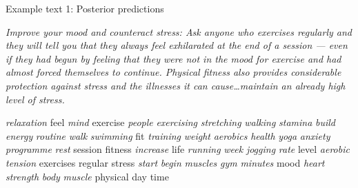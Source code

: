 \begin{frame}{Example text 1: Posterior predictions}

	{\small\textit{
Improve your mood and counteract stress: Ask anyone who exercises regularly and
they will tell you that they always feel exhilarated at the end of a session —
even if they had begun by feeling that they were not in the mood for exercise
and had almost forced themselves to continue. Physical fitness also provides
considerable protection against stress and the illnesses it can cause\ldots maintain an already high level of stress.
    }}
    \begin{center}
{\fontsize{7.29}{30}\selectfont \textit{relaxation}}
{\fontsize{13.42}{30}\selectfont feel}
{\fontsize{9.62}{30}\selectfont \textit{mind}}
{\fontsize{29.68}{30}\selectfont exercise}
{\fontsize{10.34}{30}\selectfont \textit{people}}
{\fontsize{6.97}{30}\selectfont \textit{exercising}}
{\fontsize{7.55}{30}\selectfont \textit{stretching}}
{\fontsize{18.49}{30}\selectfont \textit{walking}}
{\fontsize{10.00}{30}\selectfont \textit{stamina}}
{\fontsize{7.45}{30}\selectfont \textit{build}}
{\fontsize{6.81}{30}\selectfont \textit{energy}}
{\fontsize{11.55}{30}\selectfont \textit{routine}}
{\fontsize{16.41}{30}\selectfont \textit{walk}}
{\fontsize{8.93}{30}\selectfont \textit{swimming}}
{\fontsize{14.17}{30}\selectfont fit}
{\fontsize{17.36}{30}\selectfont \textit{training}}
{\fontsize{9.10}{30}\selectfont \textit{weight}}
{\fontsize{7.32}{30}\selectfont \textit{aerobics}}
{\fontsize{14.26}{30}\selectfont \textit{health}}
{\fontsize{7.54}{30}\selectfont \textit{yoga}}
{\fontsize{6.66}{30}\selectfont \textit{anxiety}}
{\fontsize{10.48}{30}\selectfont \textit{programme}}
{\fontsize{7.89}{30}\selectfont \textit{rest}}
{\fontsize{7.01}{30}\selectfont session}
{\fontsize{19.44}{30}\selectfont fitness}
{\fontsize{8.89}{30}\selectfont \textit{increase}}
{\fontsize{8.78}{30}\selectfont life}
{\fontsize{8.73}{30}\selectfont \textit{running}}
{\fontsize{9.96}{30}\selectfont \textit{week}}
{\fontsize{8.44}{30}\selectfont \textit{jogging}}
{\fontsize{7.94}{30}\selectfont \textit{rate}}
{\fontsize{7.09}{30}\selectfont level}
{\fontsize{12.18}{30}\selectfont \textit{aerobic}}
{\fontsize{8.87}{30}\selectfont \textit{tension}}
{\fontsize{18.45}{30}\selectfont exercises}
{\fontsize{11.58}{30}\selectfont regular}
{\fontsize{14.47}{30}\selectfont stress}
{\fontsize{7.06}{30}\selectfont \textit{start}}
{\fontsize{7.04}{30}\selectfont \textit{begin}}
{\fontsize{17.27}{30}\selectfont \textit{muscles}}
{\fontsize{6.76}{30}\selectfont \textit{gym}}
{\fontsize{12.26}{30}\selectfont \textit{minutes}}
{\fontsize{11.16}{30}\selectfont mood}
{\fontsize{12.36}{30}\selectfont \textit{heart}}
{\fontsize{11.34}{30}\selectfont \textit{strength}}
{\fontsize{19.97}{30}\selectfont \textit{body}}
{\fontsize{12.18}{30}\selectfont \textit{muscle}}
{\fontsize{16.99}{30}\selectfont physical}
{\fontsize{13.20}{30}\selectfont day}
{\fontsize{17.37}{30}\selectfont time}
    \end{center}
\end{frame}
